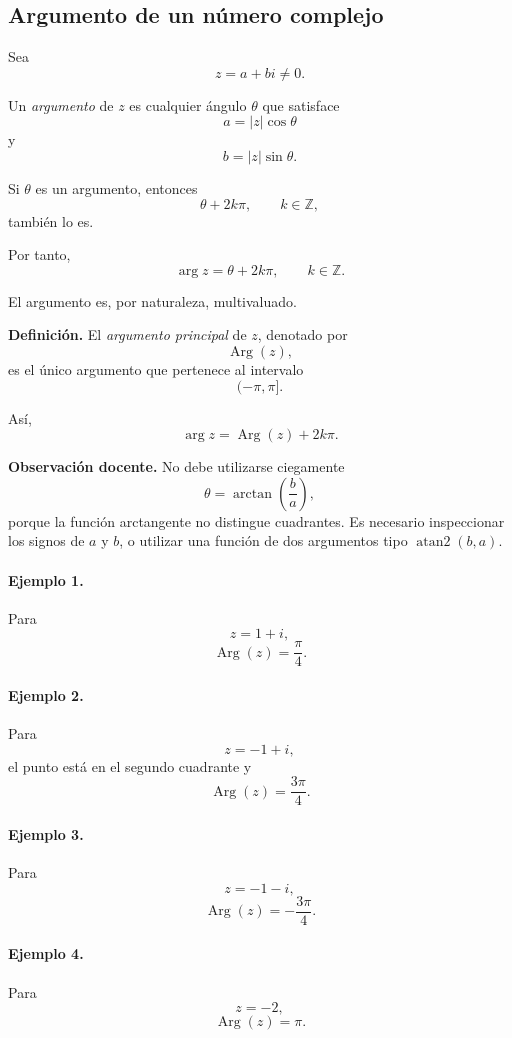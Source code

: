 \subsection{Argumento de un número complejo}

Sea
\[
z=a+bi\neq0.
\]

Un \emph{argumento} de $z$ es cualquier ángulo $\theta$ que satisface
\[
a=|z|\cos\theta
\]
y
\[
b=|z|\sin\theta.
\]

Si $\theta$ es un argumento, entonces
\[
\theta+2k\pi,
\qquad
k\in\mathbb{Z},
\]
también lo es.

Por tanto,
\[
\boxed{
\arg z
=
\theta+2k\pi,
\qquad k\in\mathbb{Z}.
}
\]

El argumento es, por naturaleza, multivaluado.

\textbf{Definición.}
El \emph{argumento principal} de $z$, denotado por
\[
\operatorname{Arg}(z),
\]
es el único argumento que pertenece al intervalo
\[
(-\pi,\pi].
\]

Así,
\[
\boxed{
\arg z
=
\operatorname{Arg}(z)+2k\pi.
}
\]

\textbf{Observación docente.}
No debe utilizarse ciegamente
\[
\theta=\arctan\left(\frac ba\right),
\]
porque la función arctangente no distingue cuadrantes. Es necesario inspeccionar
los signos de $a$ y $b$, o utilizar una función de dos argumentos tipo
$\operatorname{atan2}(b,a)$.

\paragraph{Ejemplo 1.}
Para
\[
z=1+i,
\]
\[
\operatorname{Arg}(z)=\frac{\pi}{4}.
\]

\paragraph{Ejemplo 2.}
Para
\[
z=-1+i,
\]
el punto está en el segundo cuadrante y
\[
\operatorname{Arg}(z)=\frac{3\pi}{4}.
\]

\paragraph{Ejemplo 3.}
Para
\[
z=-1-i,
\]
\[
\operatorname{Arg}(z)=-\frac{3\pi}{4}.
\]

\paragraph{Ejemplo 4.}
Para
\[
z=-2,
\]
\[
\operatorname{Arg}(z)=\pi.
\]

